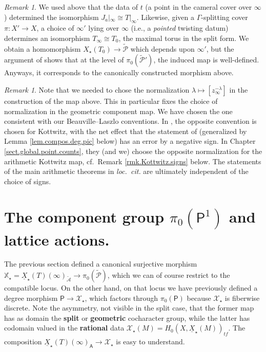 \documentclass[openany]{amsbook}
\theoremstyle{definition}
\theoremstyle{remark}
\newtheorem{remark}[theorem]{Remark}
\numberwithin{equation}{section}
\newcommand{\cA}{\mathcal{A}}
\newcommand{\cX}{\mathcal{X}}
\newcommand{\cP}{\mathcal{P}}
\newcommand{\ul}[1]{\underline{#1}}
\renewcommand{\-}{\operatorname{-}}
\newcommand{\ctA}{\widetilde{\cA}}
\newcommand{\ctP}{\widetilde{\cP}}
\newcommand{\bA}{\mathsf{A}}
\newcommand{\bX}{\mathbb{X}}
\newcommand{\bP}{\mathsf{P}}
\newcommand{\tf}{\mathit{tf}}
\begin{document}
\begin{remark}
    We used above that the data of $t$ (a point in the cameral cover over $\infty$) determined the isomorphism $J_a|_{\infty} \cong T|_{\infty}$. Likewise, given a $\Gamma$-splitting cover $\pi : X' \to X$, a choice of $\infty'$ lying over $\infty$ (i.e., a \textit{pointed} twisting datum) determines an isomorphism $T_{\infty} \cong T_0$, the maximal torus in the split form. We obtain a homomorphism $X_\star(T_0) \to \ctP$ which depends upon $\infty'$, but the argument of \cite[6.8]{ngoendo} shows that at the level of $\pi_0(\ctP')$, the induced map is well-defined. Anyways, it corresponds to the canonically constructed morphism above. 
\end{remark}


\begin{remark}\label{rmk.Kottwitz.signs.geom}
    Note that we needed to chose the normalization $\lambda \mapsto [z_\infty^{-\lambda}]$ in the construction of the map above. This in particular fixes the choice of normalization in the geometric component map. We have chosen the one consistent with our Beauville--Laszlo conventions. In \cite{CLII}, the opposite convention is chosen for Kottwitz, with the net effect that the statement of \cite[Lemma 8.3.2]{CLII} (generalized by Lemma \ref{lem.compos.deg.pic} below) has an error by a negative sign. In Chapter \ref{sect.global.point.counts}, they (and we) choose the opposite normalization for the arithmetic Kottwitz map, cf.\ Remark \ref{rmk.Kottwitz.signs} below. The statements of the main arithmetic theorems in \textit{loc.\ cit.} are ultimately independent of the choice of signs.
\end{remark}


\section{\texorpdfstring{The component group $\pi_0(\bP^{1})$ and lattice actions.}{The component group of the truncated Picard stack.}}\label{subsect.comp.grp.action}

The previous section defined a canonical surjective morphism $\bX_\star = \ul{X}_\star(T)(\infty)_{\ctA} \to \pi_0(\ctP)$, which we can of course restrict to the compatible locus. On the other hand, on that locus we have previously defined a degree morphism $\bP \to \cX_\star$, which factors through $\pi_0(\bP)$ because $\cX_\star$ is fiberwise discrete. Note the asymmetry, not visible in the split case, that the former map has as domain the \textbf{split} or \textbf{geometric} cocharacter group, while the latter has codomain valued in the \textbf{rational} data $\cX_\star(M) = H_0(X, \ul{X}_\star(M))_{\tf}$. The composition $\ul{X}_\star(T)(\infty)_{\bA} \to \cX_\star$ is easy to understand. 
\end{document}
